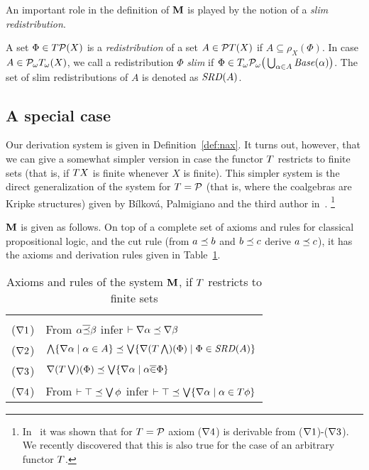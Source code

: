 \documentclass{book}
\begin{document}
An important role in the definition of $\mathbf{M}$ is played by the notion of a
\emph{slim redistribution}.

\begin{definition}
  A set $\Phi \in T\mathcal{P}(X)$ is a \emph{redistribution} of a
  set $A \in \mathcal{P}T(X)$ if $A \subseteq \rho_{X}(\Phi)$.  In
  case $A \in \mathcal{P}_{\omega}T_{\omega}(X)$, we call a redistribution $\Phi$
  \emph{slim} if $\Phi \in T_{\omega} \mathcal{P}_{\omega} \big(\bigcup_{\alpha\in A}
  \mathit{Base}(\alpha) \big)$.  The set of slim redistributions of $A$ is
  denoted as $\mathit{SRD}(A)$.
\end{definition}

\subsection*{A special case} 

Our derivation system is given in Definition~\ref{def:nax}.  It turns
out, however, that we can give a somewhat simpler version in case the
functor $T$ restricts to finite sets (that is, if $T X$ is finite
whenever $X$ is finite).  This simpler system is the direct
generalization of the system for $T=\mathcal{P}$ (that is, where the
coalgebras are Kripke structures) given by B\'{i}lkov\'a, Palmigiano
and the third author in~\cite{bilk:proo08}. \footnote{In~\cite{bilk:proo08}
it was shown that for $T = \mathcal{P}$ axiom ($\nabla 4$) is derivable from
($\nabla 1$)-($\nabla 3$). We recently discovered that this is also 
true for the case of an arbitrary functor $T$.} 

$\mathbf{M}$ is given as follows.  On top of a complete set of axioms
and rules for classical propositional logic, and the cut rule (from $a
\preceq b$ and $b \preceq c$ derive $a \preceq c$), it has the
axioms and derivation rules given in Table~\ref{tb:naxfin}.

\begin{table}[bht]
\begin{center}
\begin{tabular}{|ll|}
\hline 
\\[-4mm]
($\nabla1$) & 
From $\alpha\overline{\preceq}\beta$ infer $\vdash \nabla\alpha\preceq\nabla\beta$
\\ ($\nabla2$) &
$\bigwedge \{ \nabla\alpha \mid \alpha \in A \} \preceq
\bigvee \{ \nabla (T\bigwedge)(\Phi) \mid \Phi \in \mathit{SRD}(A) \}$
\\ ($\nabla3$) &
$\nabla(T\bigvee)(\Phi) \preceq \bigvee \{ \nabla\alpha \mid \alpha \overline{\in} \Phi \}$
\\ ($\nabla4$) &
From $\vdash \top \preceq \bigvee\phi$ infer $\vdash \top \preceq \bigvee \{ \nabla\alpha \mid 
\alpha \in T\phi \}$ 
\\ \hline
\end{tabular}
\caption{Axioms and rules of the system $\mathbf{M}$, if $T$ restricts to
finite sets}
\label{tb:naxfin}
\end{center}
\end{table}
\end{document}
